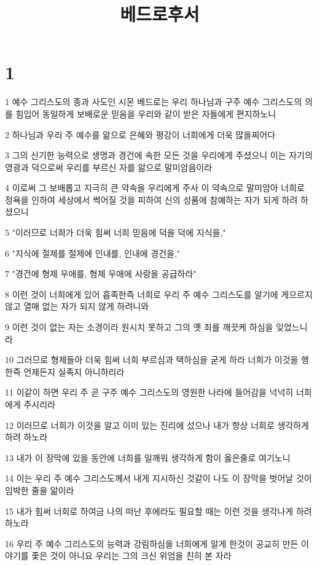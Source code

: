 

\title{베드로후서}


\chapter{1}

\par 1 예수 그리스도의 종과 사도인 시몬 베드로는 우리 하나님과 구주 예수 그리스도의 의를 힘입어 동일하게 보배로운 믿음을 우리와 같이 받은 자들에게 편지하노니
\par 2 하나님과 우리 주 예수를 앎으로 은혜와 평강이 너희에게 더욱 많을찌어다
\par 3 그의 신기한 능력으로 생명과 경건에 속한 모든 것을 우리에게 주셨으니 이는 자기의 영광과 덕으로써 우리를 부르신 자를 앎으로 말미암음이라
\par 4 이로써 그 보배롭고 지극히 큰 약속을 우리에게 주사 이 약속으로 말미암아 너희로 정욕을 인하여 세상에서 썩어질 것을 피하여 신의 성품에 참예하는 자가 되게 하려 하셨으니
\par 5 "이러므로 너희가 더욱 힘써 너희 믿음에 덕을 덕에 지식을,"
\par 6 "지식에 절제를 절제에 인내를, 인내에 경건을,"
\par 7 "경건에 형제 우애를, 형제 우애에 사랑을 공급하라"
\par 8 이런 것이 너희에게 있어 흡족한즉 너희로 우리 주 예수 그리스도를 알기에 게으르지 않고 열매 없는 자가 되지 않게 하려니와
\par 9 이런 것이 없는 자는 소경이라 원시치 못하고 그의 옛 죄를 깨끗케 하심을 잊었느니라
\par 10 그러므로 형제들아 더욱 힘써 너희 부르심과 택하심을 굳게 하라 너희가 이것을 행한즉 언제든지 실족지 아니하리라
\par 11 이같이 하면 우리 주 곧 구주 예수 그리스도의 영원한 나라에 들어감을 넉넉히 너희에게 주시리라
\par 12 이러므로 너희가 이것을 알고 이미 있는 진리에 섰으나 내가 항상 너희로 생각하게 하려 하노라
\par 13 내가 이 장막에 있을 동안에 너희를 일깨워 생각하게 함이 옳은줄로 여기노니
\par 14 이는 우리 주 예수 그리스도께서 내게 지시하신 것같이 나도 이 장막을 벗어날 것이 임박한 줄을 앎이라
\par 15 내가 힘써 너희로 하여금 나의 떠난 후에라도 필요할 때는 이런 것을 생각나게 하려 하노라
\par 16 우리 주 예수 그리스도의 능력과 강림하심을 너희에게 알게 한것이 공교히 만든 이야기를 좇은 것이 아니요 우리는 그의 크신 위엄을 친히 본 자라
